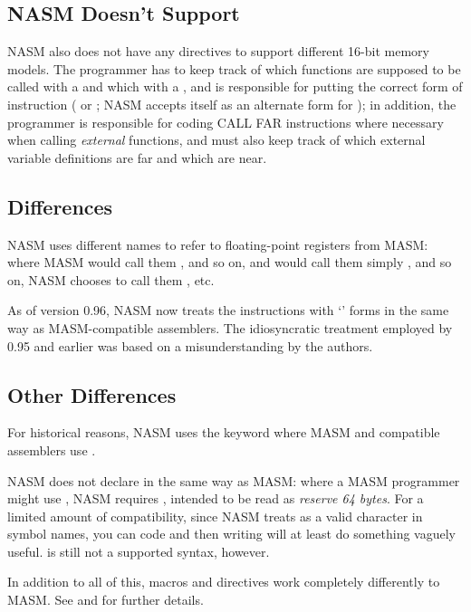 \subsection{NASM Doesn't Support }
\label{subsec:qsmodel}

NASM also does not have any directives to support different 16-bit
memory models. The programmer has to keep track of which functions
are supposed to be called with a  and which with a
, and is responsible for putting the correct form of
 instruction ( or ; NASM accepts
 itself as an alternate form for ); in addition,
the programmer is responsible for coding CALL FAR instructions where
necessary when calling \emph{external} functions, and must also keep
track of which external variable definitions are far and which are
near.

\subsection{ Differences}
\label{subsec:qsfpu}

NASM uses different names to refer to floating-point registers from
MASM: where MASM would call them ,  and
so on, and  would call them simply , 
and so on, NASM chooses to call them ,  etc.

As of version 0.96, NASM now treats the instructions with
`' forms in the same way as MASM-compatible assemblers.
The idiosyncratic treatment employed by 0.95 and earlier was based
on a misunderstanding by the authors.

\subsection{Other Differences}
\label{subsec:qsother}

For historical reasons, NASM uses the keyword  where
MASM and compatible assemblers use .

NASM does not declare  in the same way
as MASM: where a MASM programmer might use ,
NASM requires , intended to be read as \emph{reserve 64
bytes}. For a limited amount of compatibility, since NASM treats
 as a valid character in symbol names, you can code 
and then writing  will at least do something vaguely useful.
 is still not a supported syntax, however.

In addition to all of this, macros and directives work completely
differently to MASM. See  and 
for further details.
